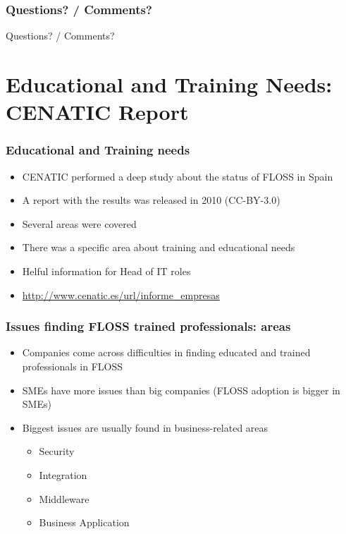 \documentclass{beamer}
\begin{document}


\begin{frame}
\frametitle{Questions? / Comments?}
\begin{center}
\huge{Questions? / Comments?}
\end{center}
\end{frame}


\section{Educational and Training Needs: CENATIC Report}



\begin{frame}
\frametitle{Educational and Training needs}
\begin{itemize}
\item CENATIC performed a deep study about the status of FLOSS in Spain
\item A report with the results was released in 2010 (CC-BY-3.0)
\item Several areas were covered
\item There was a specific area about training and educational needs
\item Helful information for Head of IT roles 
\item \url{http://www.cenatic.es/url/informe_empresas}
\end{itemize}
\end{frame}


\begin{frame}
\frametitle{Issues finding FLOSS trained professionals: areas}
\begin{itemize}
\item Companies come across difficulties in finding educated and trained professionals in FLOSS
\item SMEs have more issues than big companies (FLOSS adoption is bigger in SMEs)
\item Biggest issues are usually found in business-related areas
   \begin{itemize}
   \item Security
   \item Integration
   \item Middleware
   \item Business Application
   \end{itemize}
\end{itemize}
\end{frame}
\end{document}
